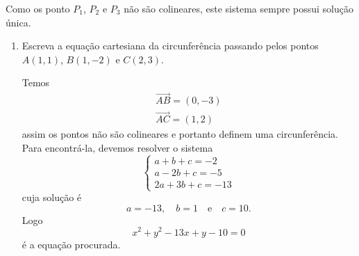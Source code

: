 Como os ponto $P_1$, $P_2$ e $P_3$ não são colineares, este sistema sempre possui solução \'unica.

\begin{exemplos}
  \begin{enumerate}
    \item Escreva a equação cartesiana da circunferência passando pelos pontos $A(1,1)$, $B(1,-2)$ e $C(2,3)$.
    \begin{solucao}
      Temos
      \begin{align*}
        \vec{AB} = (0,-3)\\
        \vec{AC} = (1,2)
      \end{align*}
      assim os pontos não são colineares e portanto definem uma circunferência. Para encontr\'a-la, devemos resolver o sistema
      \[
        \begin{cases}
          a + b + c = -2\\
          a - 2b + c = -5\\
          2a + 3b + c = -13
        \end{cases}
      \]
      cuja solução é
      \[
        a = -13,\quad b = 1 \quad\mbox{e}\quad c = 10.
      \]
      Logo
      \[
        x^2 + y^2 - 13x + y - 10 = 0
      \]
      é a equação procurada.


\end{solucao}
\end{enumerate}
\end{exemplos}
